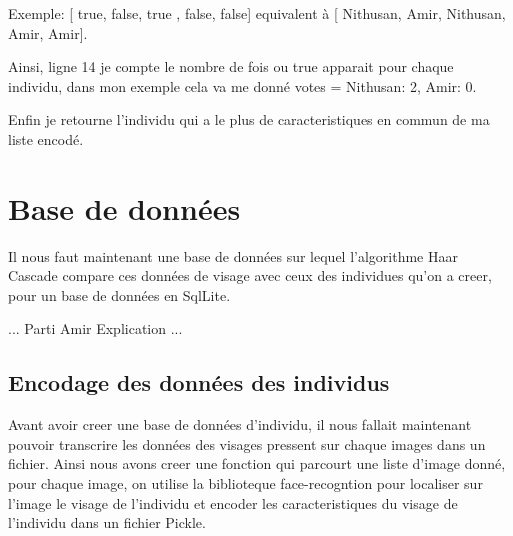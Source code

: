 \documentclass{article}
\begin{document}
Exemple: [ true, false, true , false, false] equivalent à [ Nithusan, Amir, Nithusan, Amir, Amir].

Ainsi, ligne 14 je compte le nombre de fois ou true apparait pour chaque individu, dans mon exemple cela va me donné
votes = { Nithusan: 2, Amir: 0}.

Enfin je retourne l'individu qui a le plus de caracteristiques en commun de ma liste encodé.

    

\newpage
\section{Base de données}

Il nous faut maintenant une base de données sur lequel l'algorithme Haar Cascade compare ces données de visage avec ceux 
des individues qu'on a creer, pour un base de données en SqlLite.

... Parti Amir Explication ...





\subsection{Encodage des données des individus}

Avant avoir creer une base de données d'individu, il nous fallait maintenant pouvoir transcrire les données des visages pressent sur chaque images dans un fichier.
Ainsi nous avons creer une fonction qui parcourt une liste d'image donné, pour chaque 
image, on utilise la biblioteque face-recogntion pour localiser sur l'image le visage de l'individu et encoder les caracteristiques du visage de l'individu dans
un fichier Pickle. 
\end{document}
